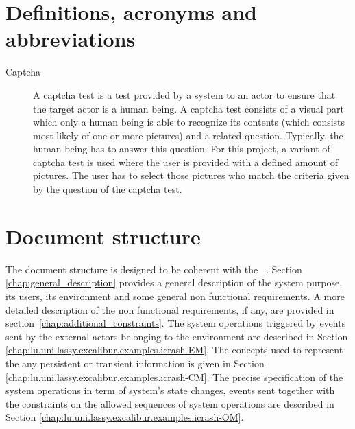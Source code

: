  
\section{Definitions, acronyms and abbreviations}

\begin{description}
\item[Captcha]
A captcha test is a test provided by a system to an actor to ensure
that the target actor is a human being. A captcha test consists of a visual
part which only a human being is able to recognize its contents (which consists
most likely of one or more pictures) and a related question. Typically, the
human being has to answer this question. For this project, a variant of captcha
test is used where the user is provided with a defined amount of pictures. The
user has to select those pictures who match the criteria given by the question
of the captcha test.
\end{description}

\section{Document structure} 
The document structure is designed to be coherent with the
\msrmessirmeth~\cite{messirbook}. Section \ref{chap:general_description} provides a general
description of the system purpose, its users, its environment and some general
non functional requirements. A more detailed description of the non functional
requirements, if any, are provided in section~\ref{chap:additional_constraints}.
The \glspl{system operation} triggered by events sent by the external
\glspl{actor}  belonging to the environment are described in Section \ref{chap:lu.uni.lassy.excalibur.examples.icrash-EM}.
The \msricrash concepts used to represent the any persistent or transient
information is given in Section \ref{chap:lu.uni.lassy.excalibur.examples.icrash-CM}. The precise specification of the system operations in term of system's state changes, events sent together with the constraints on the allowed sequences of system operations are described in Section
\ref{chap:lu.uni.lassy.excalibur.examples.icrash-OM}.
